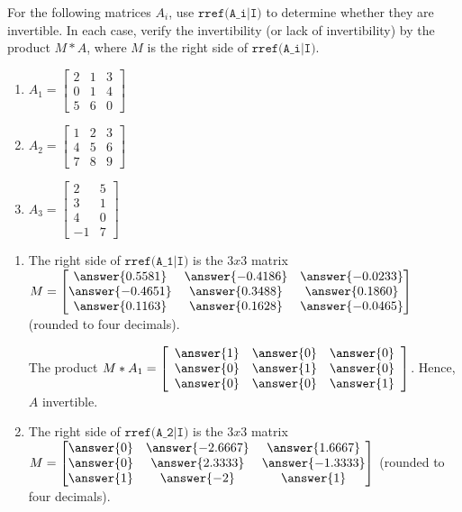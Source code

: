\documentclass{ximera}
\begin{document}
\begin{exploration}
  For the following matrices $A_i$, use $\texttt{rref(A\_i|I)}$ to determine whether they are invertible. In each case, verify the invertibility (or lack of invertibility) by the product $M*A$, where $M$ is the right side of $\texttt{rref(A\_i|I)}$.

  \begin{enumerate}
  \item $A_1=
    \begin{bmatrix} 
      2 & 1 & 3 \\ 
      0 & 1 & 4 \\ 
      5 & 6 & 0 
      \end{bmatrix}$

  \item $A_2=\begin{bmatrix} 
    1 & 2 & 3 \\ 
    4 & 5 & 6 \\ 
    7 & 8 & 9 
    \end{bmatrix}$
  \item $A_3=\begin{bmatrix} 
    2 & 5 \\ 
    3 & 1 \\ 
    4 & 0 \\ 
    -1 & 7 \end{bmatrix}$
  \end{enumerate}
  
  \begin{enumerate}
    \item The right side of $\texttt{rref(A\_1|I)}$ is the $3x3$ matrix $M = \begin{bmatrix} 
      \answer{0.5581} & \answer{-0.4186} & \answer{-0.0233} \\ 
      \answer{-0.4651} & \answer{0.3488} & \answer{0.1860} \\ 
      \answer{0.1163} & \answer{0.1628} & \answer{-0.0465} 
      \end{bmatrix}$ (rounded to four decimals).

    The product $M*A_1=   \startmat{rrr}
    \answer{1} & \answer{0} & \answer{0} \\ 
    \answer{0} & \answer{1} & \answer{0} \\ 
    \answer{0} & \answer{0} & \answer{1} 
  \stopmat$. Hence, $A$   invertible.
    \item The right side of $\texttt{rref(A\_2|I)}$ is the $3x3$ matrix $M = \begin{bmatrix} 
      \answer{0} & \answer{-2.6667} & \answer{1.6667} \\ 
      \answer{0} & \answer{2.3333} & \answer{-1.3333} \\ 
      \answer{1} & \answer{-2} & \answer{1} 
      \end{bmatrix}$ (rounded to four decimals).
      

\end{enumerate}
\end{exploration}
\end{document}
